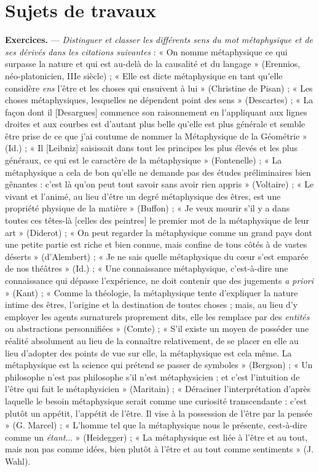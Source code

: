 {\footnotesize 
\section{Sujets de travaux}%

{\bf Exercices.} — {\it Distinguer et classer les différents sens du mot métaphysique
et de ses dérivés dans les citations suivantes} : « On nomme métaphysique ce
qui surpasse la nature et qui est au-delà de la causalité et du langage »
(Erennios, néo-platonicien, IIIe siècle) ; « Elle est dicte métaphysique en
tant qu’elle considère {\it ens} l’être et les choses qui ensuivent à lui » (Christine
de Pisan) ; « Les choses métaphysiques, lesquelles ne dépendent point des
sens » (Descartes) ; « La façon dont il [Desargues] commence son raisonnement
en l’appliquant aux lignes droites et aux courbes est d'autant plus
belle qu’elle est plus générale et semble être prise de ce que j'ai coutume de
nommer la Métaphysique de la Géométrie » (Id.) ; « Il [Leibniz] saisissait
dans tout les principes les plus élevés et les plus généraux, ce qui est le
caractère de la métaphysique » (Fontenelle) ; « La métaphysique a cela de
bon qu’elle ne demande pas des études préliminaires bien gênantes : c’est là
qu’on peut tout savoir sans avoir rien appris » (Voltaire) ; « Le vivant et
l’animé, au lieu d’être un degré métaphysique des êtres, est une propriété
physique de la matière » (Buffon) ; « Je veux mourir s’il y a dans toutes
ces têtes-là [celles des peintres] le premier mot de la métaphysique de leur
art » (Diderot) ; « On peut regarder la métaphysique comme un grand pays
dont une petite partie est riche et bien connue, mais confine de tous côtés
à de vastes déserts » (d'Alembert) ; « Je ne sais quelle métaphysique du
cœur s’est emparée de nos théâtres » (Id.) ; « Une connaissance métaphysique,
c’est-à-dire une connaissance qui dépasse l’expérience, ne doit contenir
que des jugements {\it a priori} » (Kant) ; « Comme la théologie, la métaphysique
tente d’expliquer la nature intime des êtres, l’origine et la destination de
toutes choses ; mais, au lieu d’y employer les agents surnaturels proprement
dits, elle les remplace par des {\it entités} ou abstractions personnifiées » (Comte) ;
« S'il existe un moyen de posséder une réalité absolument au lieu de la
connaître relativement, de se placer en elle au lieu d'adopter des points de
vue sur elle, la métaphysique est cela même. La métaphysique est la science
qui prétend se passer de symboles » (Bergson) ; « Un philosophe n’est pas
philosophe s’il n’est métaphysicien ; et c’est l’intuition de l'être qui fait le
métaphysicien » (Maritain) ; « Déraciner l'interprétation d’après laquelle
le besoin métaphysique serait comme une curiosité transcendante : c’est
plutôt un appétit, l'appétit de l’être. Il vise à la possession de l'être par la
pensée » (G. Marcel) ; « L'homme tel que la métaphysique nous le présente,
cest-à-dire comme un {\it étant}... » (Heidegger) ; « La métaphysique est liée
à l’être et au tout, mais non pas comme idées, bien plutôt à l'être et au tout
comme sentiments » (J. Wahl).

}

